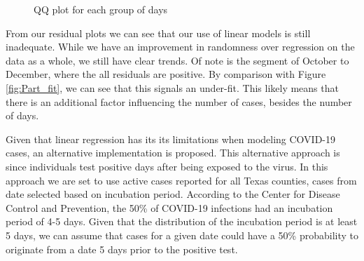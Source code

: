 \documentclass{article}
\begin{document}
\begin{figure}[H]
\centering
{}
\caption{QQ plot for each group of days}
\label{fig:Part_QQ}
\end{figure}
From our residual plots we can see that our use of linear models is still inadequate. While we have an improvement in randomness over regression on the data as a whole, we still have clear trends. Of note is the segment of October to December, where the all residuals are positive. By comparison with Figure \ref{fig:Part_fit}, we can see that this signals an under-fit. This likely means that there is an additional factor influencing the number of cases, besides the number of days.

Given that linear regression has its its limitations when modeling COVID-19 cases, an alternative implementation is proposed. This alternative approach is since individuals test positive days after being exposed to the virus. In this approach we are set to use active cases reported for all Texas counties, cases from date selected based on incubation period. According to the Center for Disease Control and Prevention, the 50\% of COVID-19 infections had an incubation period of 4-5 days. Given that the distribution of the incubation period is at least 5 days, we can assume that cases for a given date could have a 50\% probability to originate from a date 5 days prior to the positive test. 
\end{document}
